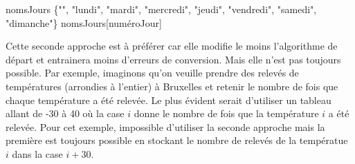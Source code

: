 		\begin{LDA}
				\Let nomsJours \Gets \{"", "lundi", "mardi", "mercredi", "jeudi", "vendredi", "samedi", "dimanche"\}
				\Return nomsJours[numéroJour]
			\EndAlgo
		\end{LDA}
		
		Cette seconde approche est à préférer 
		car elle modifie le moins l'algorithme de départ 
		et entrainera moins d'erreurs de conversion.
		Mais elle n'est pas toujours possible.
		Par exemple, imaginons qu'on veuille prendre 
		des relevés de températures (arrondies à l'entier) à Bruxelles 
		et retenir le nombre de fois que chaque température a été relevée.
		Le plus évident serait d'utiliser un tableau allant de -30 à 40
		où la case $i$ donne le nombre de fois 
		que la température $i$ a été relevée.
		Pour cet exemple, impossible d'utiliser la seconde approche
		mais la première est toujours possible en stockant
		le nombre de relevés de la températue $i$ dans la case $i+30$.
		
		
